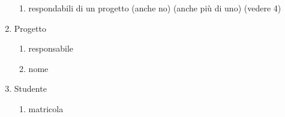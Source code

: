 \documentclass{article}
\begin{document}
\begin{enumerate}
    \begin{enumerate}
        \item respondabili di un progetto (anche no) (anche più di uno) (vedere 4)
    \end{enumerate}
    \item Progetto
    \begin{enumerate}
        \item responsabile
        \item nome
    \end{enumerate}
    \item Studente
    \begin{enumerate}
        \item matricola
    \end{enumerate}
\end{enumerate}
\end{document}
